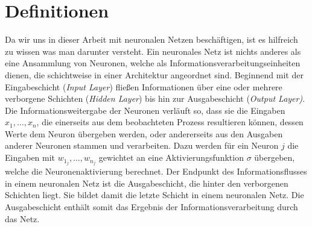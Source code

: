 \section{Definitionen}
Da wir uns in dieser Arbeit mit neuronalen Netzen beschäftigen, ist es hilfreich zu wissen was man darunter versteht. Ein neuronales Netz ist nichts anderes als eine Ansammlung von Neuronen, welche als Informationsverarbeitungseinheiten dienen, die schichtweise in einer Architektur angeordnet sind. Beginnend mit der Eingabeschicht (\textit{Input Layer}) fließen Informationen über eine oder mehrere verborgene Schichten (\textit{Hidden Layer}) bis hin zur Ausgabeschicht (\textit{Output Layer)}. Die Informationsweitergabe der Neuronen verläuft so, dass sie die Eingaben $x_1,\dots,x_n$, die einerseits aus dem beobachteten Prozess resultieren können, dessen Werte dem Neuron übergeben werden, oder andererseits aus den Ausgaben anderer Neuronen stammen und verarbeiten.
Dazu werden für ein Neuron $j$ die Eingaben mit $w_{1_j}, \dots, w_{n_j}$ gewichtet an eine Aktivierungsfunktion $\sigma$ übergeben, welche die Neuronenaktivierung berechnet. Der Endpunkt des Informationsflusses in einem neuronalen Netz ist die Ausgabeschicht, die hinter den verborgenen Schichten liegt. Sie bildet damit die letzte Schicht in einem neuronalen Netz. Die Ausgabeschicht enthält somit das Ergebnis der Informationsverarbeitung durch das Netz.  
%        
%        
